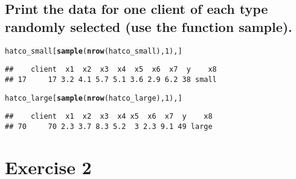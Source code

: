 \documentclass{article}\usepackage[]{graphicx}\usepackage[]{xcolor}
\makeatletter
\newcommand{\hlnum}[1]{\textcolor[rgb]{0.686,0.059,0.569}{#1}}%
\newcommand{\hldef}[1]{\textcolor[rgb]{0.345,0.345,0.345}{#1}}%
\newcommand{\hlkwd}[1]{\textcolor[rgb]{0.737,0.353,0.396}{\textbf{#1}}}%
\newenvironment{kframe}{%
 \def\at@end@of@kframe{}%
 \ifinner\ifhmode%
  \def\at@end@of@kframe{\end{minipage}}%
  \begin{minipage}{\columnwidth}%
 \fi\fi%
 \def\FrameCommand##1{\hskip\@totalleftmargin \hskip-\fboxsep
 \colorbox{shadecolor}{##1}\hskip-\fboxsep
     \hskip-\linewidth \hskip-\@totalleftmargin \hskip\columnwidth}%
 \MakeFramed {\advance\hsize-\width
   \@totalleftmargin\z@ \linewidth\hsize
   \@setminipage}}%
 {\par\unskip\endMakeFramed%
 \at@end@of@kframe}
\newenvironment{knitrout}{}{} %
\makeatother
\begin{document}
\subsection{Print the data for one client of each type randomly selected (use the function sample).}
\begin{knitrout}
\color{fgcolor}\begin{kframe}
\begin{alltt}
\hldef{hatco_small[}\hlkwd{sample}\hldef{(}\hlkwd{nrow}\hldef{(hatco_small),}\hlnum{1}\hldef{),]}
\end{alltt}
\begin{verbatim}
##    client  x1  x2  x3  x4  x5  x6  x7  y    x8
## 17     17 3.2 4.1 5.7 5.1 3.6 2.9 6.2 38 small
\end{verbatim}
\begin{alltt}
\hldef{hatco_large[}\hlkwd{sample}\hldef{(}\hlkwd{nrow}\hldef{(hatco_large),}\hlnum{1}\hldef{),]}
\end{alltt}
\begin{verbatim}
##    client  x1  x2  x3  x4 x5  x6  x7  y    x8
## 70     70 2.3 3.7 8.3 5.2  3 2.3 9.1 49 large
\end{verbatim}
\end{kframe}
\end{knitrout}

\section{Exercise 2}
\end{document}
